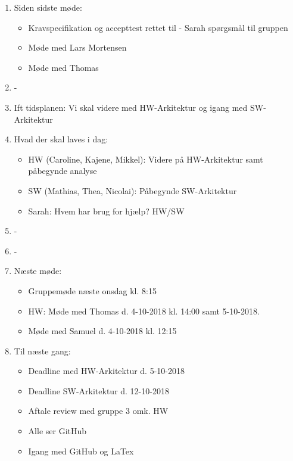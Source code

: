 \begin{enumerate}
	\item Siden sidste møde:
	\begin{itemize}
		\item Kravspecifikation og accepttest rettet til - Sarah spørgsmål til gruppen
		\item Møde med Lars Mortensen
		\item Møde med Thomas
	\end{itemize}
	\item -
	\item Ift tidsplanen: Vi skal videre med HW-Arkitektur og igang med SW-Arkitektur
	\item Hvad der skal laves i dag:
	\begin{itemize}
		\item HW (Caroline, Kajene, Mikkel): Videre på HW-Arkitektur samt påbegynde analyse
		\item SW (Mathias, Thea, Nicolai): Påbegynde SW-Arkitektur
		\item Sarah: Hvem har brug for hjælp? HW/SW
	\end{itemize}
	\item -
	\item -
	\item Næste møde:
	\begin{itemize}
		\item Gruppemøde næste onsdag kl. 8:15
		\item HW: Møde med Thomas d. 4-10-2018 kl. 14:00 samt 5-10-2018.
		\item Møde med Samuel d. 4-10-2018 kl. 12:15
	\end{itemize}
	\item Til næste gang:
	\begin{itemize}
		\item Deadline med HW-Arkitektur d. 5-10-2018
		\item Deadline SW-Arkitektur d. 12-10-2018
		\item Aftale review med gruppe 3 omk. HW
		\item Alle ser GitHub
		\item Igang med GitHub og LaTex
	\end{itemize}
\end{enumerate}

\clearpage